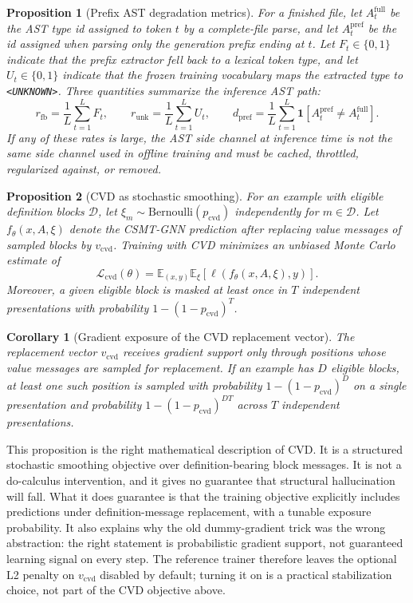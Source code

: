 \documentclass[10pt]{article}
\newtheorem{proposition}{Proposition}
\newtheorem{corollary}{Corollary}
\begin{document}
\begin{proposition}[Prefix AST degradation metrics]
\label{prop:prefix-metrics}
For a finished file, let $A^{\mathrm{full}}_t$ be the AST type id assigned to
token $t$ by a complete-file parse, and let $A^{\mathrm{pref}}_t$ be the id
assigned when parsing only the generation prefix ending at $t$.  Let
$F_t\in\{0,1\}$ indicate that the prefix extractor fell back to a lexical token
type, and let $U_t\in\{0,1\}$ indicate that the frozen training vocabulary maps
the extracted type to \texttt{<UNKNOWN>}.  Three quantities summarize the
inference AST path:
\[
  r_{\mathrm{fb}}=\frac{1}{L}\sum_{t=1}^L F_t,\qquad
  r_{\mathrm{unk}}=\frac{1}{L}\sum_{t=1}^L U_t,\qquad
  d_{\mathrm{pref}}=\frac{1}{L}\sum_{t=1}^L
  \mathbf{1}\!\left[A^{\mathrm{pref}}_t\ne A^{\mathrm{full}}_t\right].
\]
If any of these rates is large, the AST side channel at inference time is not
the same side channel used in offline training and must be cached, throttled,
regularized against, or removed.
\end{proposition}


\begin{proposition}[CVD as stochastic smoothing]
\label{prop:cvd}
For an example with eligible definition blocks $\mathcal{D}$, let
$\xi_m\sim\mathrm{Bernoulli}(p_{\mathrm{cvd}})$ independently for
$m\in\mathcal{D}$.  Let $f_\theta(x,A,\xi)$ denote the CSMT-GNN prediction after
replacing value messages of sampled blocks by $v_{\mathrm{cvd}}$.  Training with
CVD minimizes an unbiased Monte Carlo estimate of
\[
  \mathcal{L}_{\mathrm{cvd}}(\theta)
  =
  \mathbb{E}_{(x,y)}
  \mathbb{E}_{\xi}
  \left[\ell(f_\theta(x,A,\xi),y)\right].
\]
Moreover, a given eligible block is masked at least once in $T$ independent
presentations with probability $1-(1-p_{\mathrm{cvd}})^T$.
\end{proposition}


\begin{corollary}[Gradient exposure of the CVD replacement vector]
\label{cor:cvd-gradient}
The replacement vector $v_{\mathrm{cvd}}$ receives gradient support only through
positions whose value messages are sampled for replacement.  If an example has
$D$ eligible blocks, at least one such position is sampled with probability
$1-(1-p_{\mathrm{cvd}})^D$ on a single presentation and probability
$1-(1-p_{\mathrm{cvd}})^{DT}$ across $T$ independent presentations.
\end{corollary}


This proposition is the right mathematical description of CVD.  It is a
structured stochastic smoothing objective over definition-bearing block
messages.  It is not a do-calculus intervention, and it gives no guarantee that
structural hallucination will fall.  What it does guarantee is that the training
objective explicitly includes predictions under definition-message replacement,
with a tunable exposure probability.  It also explains why the old dummy-gradient
trick was the wrong abstraction: the right statement is probabilistic gradient
support, not guaranteed learning signal on every step.  The reference trainer
therefore leaves the optional L2 penalty on $v_{\mathrm{cvd}}$ disabled by
default; turning it on is a practical stabilization choice, not part of the CVD
objective above.
\end{document}

